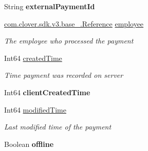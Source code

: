 \begin{DoxyCompactItemize}
\mbox{\label{classcom_1_1clover_1_1sdk_1_1v3_1_1payments_1_1_payment_afc446c973d90752e59a5d8ba34e6d169}} 
String {\bfseries external\+Payment\+Id}
\item 
\hyperlink{classcom_1_1clover_1_1sdk_1_1v3_1_1base___1_1_reference}{com.\+clover.\+sdk.\+v3.\+base\+\_\+.\+Reference} \hyperlink{classcom_1_1clover_1_1sdk_1_1v3_1_1payments_1_1_payment_a9d11a012f89ae999fa4147b89499dd09}{employee}
\begin{DoxyCompactList}\small\item\em The employee who processed the payment \end{DoxyCompactList}\item 
Int64 \hyperlink{classcom_1_1clover_1_1sdk_1_1v3_1_1payments_1_1_payment_a900ea8c8b2091902f5bf38e8343ead00}{created\+Time}
\begin{DoxyCompactList}\small\item\em Time payment was recorded on server \end{DoxyCompactList}\item 
\mbox{\label{classcom_1_1clover_1_1sdk_1_1v3_1_1payments_1_1_payment_aa9c2fecfc6a7df3caa188524a74da1fa}} 
Int64 {\bfseries client\+Created\+Time}
\item 
Int64 \hyperlink{classcom_1_1clover_1_1sdk_1_1v3_1_1payments_1_1_payment_a1ba3cec2bc2d9195c5df4bf0ccfeba90}{modified\+Time}
\begin{DoxyCompactList}\small\item\em Last modified time of the payment \end{DoxyCompactList}\item 
\mbox{\label{classcom_1_1clover_1_1sdk_1_1v3_1_1payments_1_1_payment_a34801161ba730307156e5862cbe622f2}} 
Boolean {\bfseries offline}

\end{DoxyCompactItemize}
